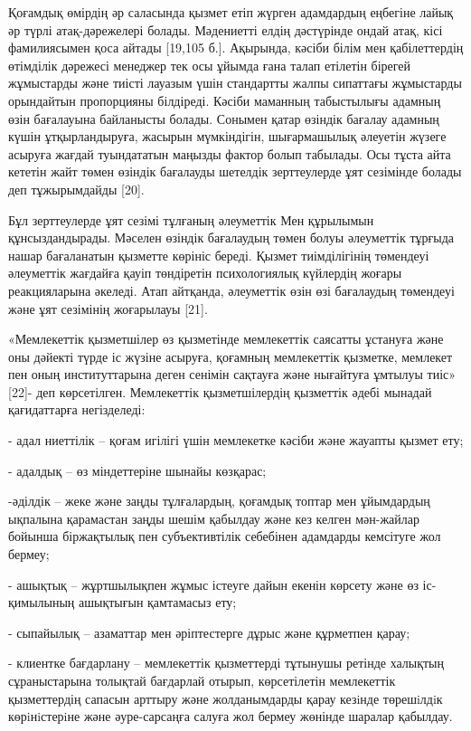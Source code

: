 Қоғамдық өмірдің әр саласында қызмет етіп жүрген адамдардың еңбегіне
лайық әр түрлі атақ-дәрежелері болады. Мәдениетті елдің дәстүрінде ондай
атақ, кісі фамилиясымен қоса айтады {[}19,105 б.{]}. Ақырында, кәсіби
білім мен қабілеттердің өтімділік дәрежесі менеджер тек осы ұйымда ғана
талап етілетін бірегей жұмыстарды және тиісті лауазым үшін стандартты
жалпы сипаттағы жұмыстарды орындайтын пропорцияны білдіреді. Кәсіби
маманның табыстылығы адамның өзін бағалауына байланысты болады. Сонымен
қатар өзіндік бағалау адамның күшін ұтқырландыруға, жасырын мүмкіндігін,
шығармашылық әлеуетін жүзеге асыруға жағдай туындататын маңызды фактор
болып табылады. Осы тұста айта кететін жайт төмен өзіндік бағалауды
шетелдік зерттеулерде ұят сезімінде болады деп тұжырымдайды {[}20{]}.

Бұл зерттеулерде ұят сезімі тұлғаның әлеуметтік Мен құрылымын
құнсыздандырады. Мәселен өзіндік бағалаудың төмен болуы әлеуметтік
тұрғыда нашар бағаланатын қызметте көрініс береді. Қызмет тиімділігінің
төмендеуі әлеуметтік жағдайға қауіп төндіретін психологиялық күйлердің
жоғары реакцияларына әкеледі. Атап айтқанда, әлеуметтік өзін өзі
бағалаудың төмендеуі және ұят сезімінің жоғарылауы {[}21{]}.

«Мемлекеттік қызметшілер өз қызметінде мемлекеттік саясатты ұстануға
және оны дәйекті түрде іс жүзіне асыруға, қоғамның мемлекеттік қызметке,
мемлекет пен оның институттарына деген сенімін сақтауға және нығайтуға
ұмтылуы тиіс» {[}22{]}- деп көрсетілген. Мемлекеттік қызметшілердің
қызметтік әдебі мынадай қағидаттарға негізделеді:

- адал ниеттілік -- қоғам игілігі үшін мемлекетке кәсіби және жауапты
қызмет ету;

- адалдық -- өз міндеттеріне шынайы көзқарас;

-әділдік -- жеке және заңды тұлғалардың, қоғамдық топтар мен ұйымдардың
ықпалына қарамастан заңды шешім қабылдау және кез келген мән-жайлар
бойынша біржақтылық пен субъективтілік себебінен адамдарды кемсітуге жол
бермеу;

- ашықтық -- жұртшылықпен жұмыс істеуге дайын екенін көрсету және өз
іс-қимылының ашықтығын қамтамасыз ету;

- сыпайылық -- азаматтар мен әріптестерге дұрыс және құрметпен қарау;

- клиентке бағдарлану -- мемлекеттік қызметтерді тұтынушы ретінде
халықтың сұраныстарына толықтай бағдарлай отырып, көрсетілетін
мемлекеттік қызметтердің сапасын арттыру және жолданымдарды қарау
кезiнде төрешiлдiк көрiнiстерiне және әуре-сарсаңға салуға жол бермеу
жөнінде шаралар қабылдау.

